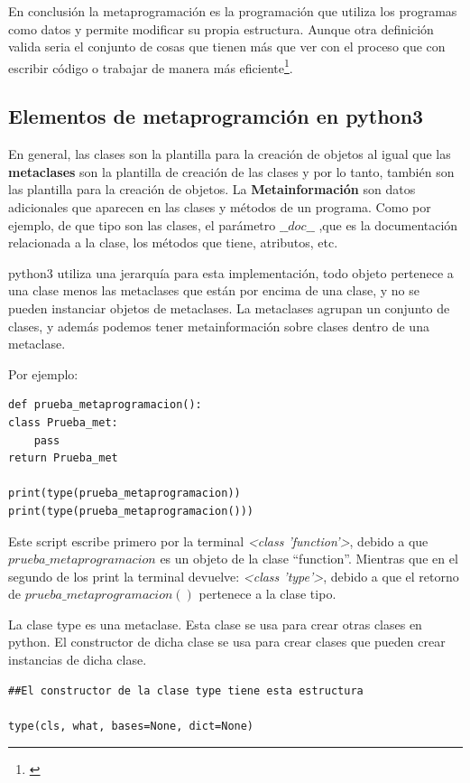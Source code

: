 \documentclass{cosas/tfg_domingo}
\begin{document}
En conclusión la metaprogramación es la programación que utiliza los programas como datos y permite modificar su propia estructura. Aunque otra definición valida seria el conjunto de cosas que tienen más que ver con el proceso que con escribir código o trabajar de manera más eficiente\footnote{\citep{silva2018metaprogramacion}}.

\subsection{Elementos de metaprogramción en python3}
En general, las clases son la plantilla para la creación de objetos al igual que las \textbf{metaclases} son la plantilla de creación de las clases y por lo tanto, también son las plantilla para la creación de objetos.
La \textbf{Metainformación} son datos adicionales que aparecen en las clases y métodos de un programa. Como por ejemplo, de que tipo son las clases, el parámetro $\_\_doc\_\_$ ,que es la documentación relacionada a la clase, los métodos que tiene, atributos, etc. 

python3 utiliza una jerarquía para esta implementación, todo objeto pertenece a una clase menos las metaclases que están por encima de una clase, y no se pueden instanciar objetos de metaclases. La metaclases agrupan un conjunto de clases, y además podemos tener metainformación sobre clases dentro de una metaclase. 

\newpage

Por ejemplo:

\begin{verbatim}
def prueba_metaprogramacion():
class Prueba_met:
    pass
return Prueba_met

print(type(prueba_metaprogramacion))
print(type(prueba_metaprogramacion()))
\end{verbatim}

Este script escribe primero por la terminal \textit{<class 'function'>}, debido a que $prueba\_metaprogramacion$ es un objeto de la clase “function”. Mientras que en el segundo de los print la terminal devuelve: \textit{<class 'type'>}, debido a que el retorno de $prueba\_metaprogramacion()$ pertenece a la clase tipo.

La clase type es una metaclase. Esta clase se usa para crear otras clases en python. El constructor de dicha clase se usa para crear clases que pueden crear instancias de dicha clase.

\begin{verbatim}
##El constructor de la clase type tiene esta estructura

type(cls, what, bases=None, dict=None)
\end{verbatim}
\end{document}
